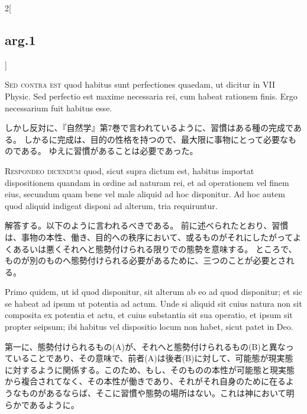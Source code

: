 \documentclass[paper=a4paper,fontsize=10pt,jafontsize=9pt,titlepage]{jlreq}
\begin{document}
\begin{paracol}{2}[\subsection{arg.1}]
\switchcolumn*[\subsection{s.c.}]

{\scshape Sed contra est} quod habitus sunt perfectiones quaedam, ut dicitur in
 VII Physic. Sed perfectio est maxime necessaria rei, cum habeat
 rationem finis. Ergo necessarium fuit habitus esse.

\switchcolumn

しかし反対に、『自然学』第7巻で言われているように、習慣はある種の完成である。
しかるに完成は、目的の性格を持つので、最大限に事物にとって必要なものである。
ゆえに習慣があることは必要であった。


{\scshape Respondeo dicendum} quod, sicut supra dictum est, habitus importat
dispositionem quandam in ordine ad naturam rei, et ad operationem vel
finem eius, secundum quam bene vel male aliquid ad hoc disponitur. Ad
hoc autem quod aliquid indigeat disponi ad alterum, tria
requiruntur.

\switchcolumn

解答する。以下のように言われるべきである。
前に述べられたとおり、習慣は、事物の本性、働き、目的への秩序において、或るものがそれにしたがってよくあるいは悪くそれへと態勢付けられる限りでの態勢を意味する。
ところで、ものが別のものへ態勢付けられる必要があるために、三つのことが必要とされる。

\switchcolumn*

Primo quidem, ut id quod disponitur, sit alterum ab eo ad
quod disponitur; et sic se habeat ad ipsum ut potentia ad actum. Unde
si aliquid sit cuius natura non sit composita ex potentia et actu, et
cuius substantia sit sua operatio, et ipsum sit propter seipsum; ibi
habitus vel dispositio locum non habet, sicut patet in Deo.

\switchcolumn

第一に、態勢付けられるもの(A)が、それへと態勢付けられるもの(B)と異なっ
ていることであり、その意味で、前者(A)は後者(B)に対して、可能態が現実態
に対するように関係する。このため、もし、そのものの本性が可能態と現実態
から複合されてなく、その本性が働きであり、それがそれ自身のために在るよ
うなものがあるならば、そこに習慣や態勢の場所はない。これは神において明
らかであるように。


\end{paracol}
\end{document}

